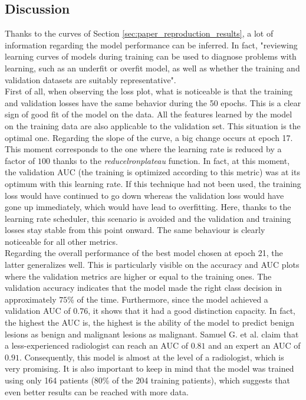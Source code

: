 \subsection{Discussion}
\setlength{\marginparwidth}{3cm}\leavevmode {}Thanks to the curves of Section \ref{sec:paper_reproduction_results}, a lot of information regarding the model performance can be inferred. In fact, "reviewing learning curves of models during training can be used to diagnose problems with learning, such as an underfit or overfit model, as well as whether the training and validation datasets are suitably representative"\cite{40}.\\
First of all, when observing the loss plot, what is noticeable is that the training and validation losses have the same behavior during the 50 epochs. This is a clear sign of good fit of the model on the data. All the features learned by the model on the training data are also applicable to the validation set. This situation is the optimal one. Regarding the slope of the curve, a big change occurs at epoch 17. This moment corresponds to the one where the learning rate is reduced by a factor of $100$ thanks to the \textit{reducelronplateau} function. In fact, at this moment, the validation AUC (the training is optimized according to this metric) was at its optimum with this learning rate. If this technique had not been used, the training loss would have continued to go down whereas the validation loss would have gone up immediately, which would have lead to overfitting. Here, thanks to the learning rate scheduler, this scenario is avoided and the validation and training losses stay stable from this point onward. The same behaviour is clearly noticeable for all other metrics.\\
Regarding the overall performance of the best model chosen at epoch 21, the latter generalizes well. This is particularly visible on the accuracy and AUC plots where the validation metrics are higher or equal to the training ones. The validation accuracy indicates that the model made the right class decision in approximately $75$\% of the time. Furthermore, since the model achieved a validation AUC of $0.76$, it shows that it had a good distinction capacity. In fact, the highest the AUC is, the highest is the ability of the model to predict benign lesions as benign and malignant lesions as malignant. Samuel G. et al. \cite{42} claim that a less-experienced radiologist can reach an AUC of $0.81$ and an expert an AUC of $0.91$. Consequently, this model is almost at the level of a radiologist, which is very promising. It is also important to keep in mind that the model was trained using only 164 patients (80\% of the 204 training patients), which suggests that even better results can be reached with more data.\\
